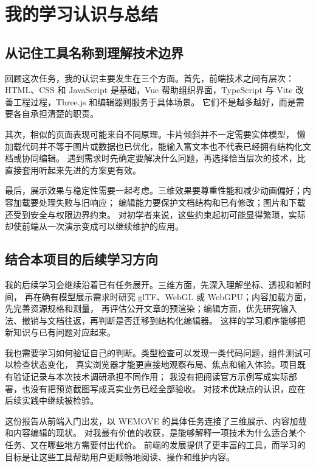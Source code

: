 \section{我的学习认识与总结}
\subsection{从记住工具名称到理解技术边界}
回顾这次任务，我的认识主要发生在三个方面。首先，前端技术之间有层次：HTML、CSS 和 JavaScript
是基础，Vue 帮助组织界面，TypeScript 与 Vite 改善工程过程，Three.js 和编辑器则服务于具体场景。%
它们不是越多越好，而是需要各自承担清楚的职责。

其次，相似的页面表现可能来自不同原理。卡片倾斜并不一定需要实体模型，%
懒加载代码并不等于图片或数据也已优化，能输入富文本也不代表已经拥有结构化文档或协同编辑。%
遇到需求时先确定要解决什么问题，再选择恰当层次的技术，比直接套用听起来先进的方案更有效。

最后，展示效果与稳定性需要一起考虑。三维效果要尊重性能和减少动画偏好；内容加载要处理失败与旧响应；%
编辑能力要保护文档结构和已有修改；图片和下载还受到安全与权限边界约束。%
对初学者来说，这些约束起初可能显得繁琐，实际却使前端从一次演示变成可以继续维护的应用。

\subsection{结合本项目的后续学习方向}
我的后续学习会继续沿着已有任务展开。三维方面，先深入理解坐标、透视和帧时间，%
再在确有模型展示需求时研究 glTF、WebGL 或 WebGPU；内容加载方面，先完善资源规格和测量，%
再评估公开文章的预渲染；编辑方面，优先研究输入法、撤销与文档往返，再判断是否迁移到结构化编辑器。%
这样的学习顺序能够把新知识与已有问题对应起来。

我也需要学习如何验证自己的判断。类型检查可以发现一类代码问题，组件测试可以检查状态变化，%
真实浏览器才能更直接地观察布局、焦点和输入体验。项目既有验证记录与本次技术调研承担不同作用；%
我没有把阅读官方示例写成实际部署，也没有把预览截图写成真实业务已经全部验收。%
对技术优缺点的认识，应在后续实践中继续被检验。

这份报告从前端入门出发，以 WEMOVE 的具体任务连接了三维展示、内容加载和内容编辑的现状。%
对我最有价值的收获，是能够解释一项技术为什么适合某个任务、又在哪些地方需要付出代价。%
前端的发展提供了更丰富的工具，而学习的目标是让这些工具帮助用户更顺畅地阅读、操作和维护内容。
